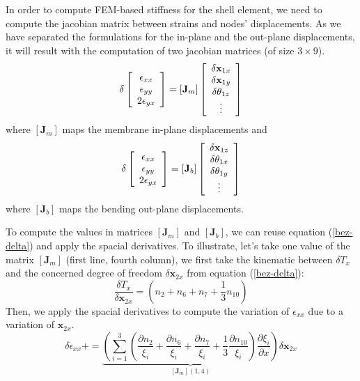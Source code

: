 \documentclass{egpubl}
\begin{document}
In order to compute FEM-based stiffness for the shell element, we need to compute the jacobian matrix between strains and nodes' displacements.
As we have separated the formulations for the in-plane and the out-plane displacements, it will result with the computation of two jacobian matrices (of size $3\times9$).
\begin{equation}
\delta \left[ \begin{array}[c]{c} \epsilon_{xx} \\ \epsilon_{yy}  \\ 2\epsilon_{yx} \end{array} \right] = 
\left[ \mathbf{J}_m \right] 
\left[ \begin{array}[c]{c} \delta \mathbf{x}_{1x} \\ \delta \mathbf{x}_{1y} \\ \delta \theta_{1z} \\ \vdots    \end{array} \right]
\end{equation}
where $\left[ \mathbf{J}_m \right]$ maps the membrane in-plane displacements and 
%
\begin{equation}
\delta \left[ \begin{array}[c]{c} \epsilon_{xx} \\ \epsilon_{yy}  \\ 2\epsilon_{yx} \end{array} \right] = 
\left[ \mathbf{J}_b \right] 
\left[ \begin{array}[c]{c} \delta \mathbf{x}_{1z} \\ \delta \theta_{1x} \\ \delta \theta_{1y} \\ \vdots    \end{array} \right]
\end{equation}
where $\left[ \mathbf{J}_b \right]$ maps the bending out-plane displacements.

To compute the values in matrices $\left[ \mathbf{J}_m \right]$ and $\left[ \mathbf{J}_b \right]$,  we can reuse equation (\ref{bez-delta}) and apply the spacial derivatives.
To illustrate, let's take one value of the matrix $\left[ \mathbf{J}_m \right]$  (first line, fourth column), we first take the kinematic between $\delta T_x$ and the concerned degree of freedom $ \delta \mathbf{x}_{2x}$ from equation (\ref{bez-delta}):
$$
   \frac{ \delta T_x}{ \delta \mathbf{x}_{2x}} = (n_2 + n_6 + n_7 + \frac{1}{3} n_{10})
$$
Then, we apply the spacial derivatives to compute the variation of $\epsilon_{xx}$ due to a variation of $\mathbf{x}_{2x}$.
$$
\delta \epsilon_{xx} += 
\underbrace{\left( \sum_{i=1}^{3} (\frac{\partial n_2}{\xi_i} + \frac{\partial n_6}{\xi_i} + \frac{\partial n_7}{\xi_i} + \frac{1}{3}\frac{\partial n_{10}}{\xi_i})\frac{\partial \xi_i}{\partial x} \right) }_{\left[ \mathbf{J}_m \right](1,4)}  
{\delta \mathbf{x}_{2x}}
$$
\end{document}
